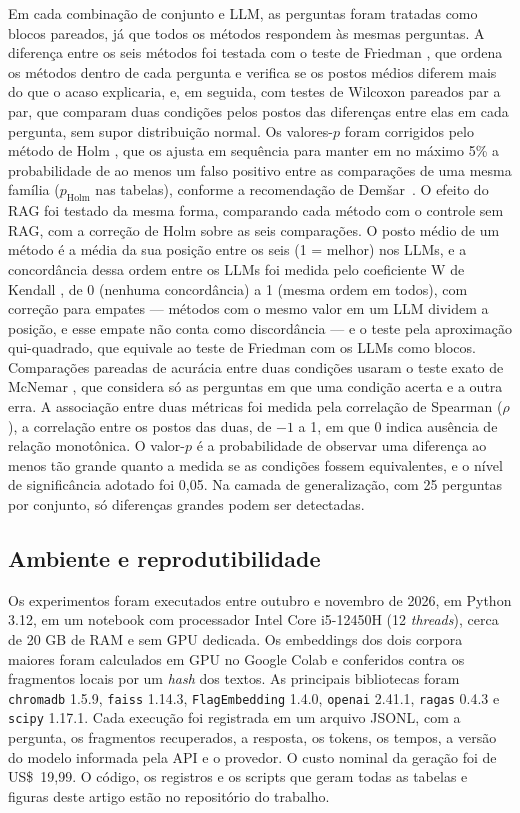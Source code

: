 Em cada combinação de conjunto e LLM, as perguntas foram tratadas como blocos pareados, já que todos os métodos respondem às mesmas perguntas. A diferença entre os seis métodos foi testada com o teste de Friedman \cite{friedman1937ranks}, que ordena os métodos dentro de cada pergunta e verifica se os postos médios diferem mais do que o acaso explicaria, e, em seguida, com testes de Wilcoxon pareados \cite{wilcoxon1945individual} par a par, que comparam duas condições pelos postos das diferenças entre elas em cada pergunta, sem supor distribuição normal. Os valores-$p$ foram corrigidos pelo método de Holm \cite{holm1979simple}, que os ajusta em sequência para manter em no máximo 5\% a probabilidade de ao menos um falso positivo entre as comparações de uma mesma família ($p_{\text{Holm}}$ nas tabelas), conforme a recomendação de Demšar~\cite{demsar2006statistical}. O efeito do RAG foi testado da mesma forma, comparando cada método com o controle sem RAG, com a correção de Holm sobre as seis comparações. O posto médio de um método é a média da sua posição entre os seis (1 = melhor) nos LLMs, e a concordância dessa ordem entre os LLMs foi medida pelo coeficiente W de Kendall \cite{kendall1939mrankings}, de 0 (nenhuma concordância) a 1 (mesma ordem em todos), com correção para empates --- métodos com o mesmo valor em um LLM dividem a posição, e esse empate não conta como discordância --- e o teste pela aproximação qui-quadrado, que equivale ao teste de Friedman com os LLMs como blocos. Comparações pareadas de acurácia entre duas condições usaram o teste exato de McNemar \cite{mcnemar1947note}, que considera só as perguntas em que uma condição acerta e a outra erra. A associação entre duas métricas foi medida pela correlação de Spearman \cite{spearman1904proof} ($\rho$), a correlação entre os postos das duas, de $-1$ a 1, em que 0 indica ausência de relação monotônica. O valor-$p$ é a probabilidade de observar uma diferença ao menos tão grande quanto a medida se as condições fossem equivalentes, e o nível de significância adotado foi 0,05. Na camada de generalização, com 25 perguntas por conjunto, só diferenças grandes podem ser detectadas.

\subsection{Ambiente e reprodutibilidade}

Os experimentos foram executados entre outubro e novembro de 2026, em Python 3.12, em um notebook com processador Intel Core i5-12450H (12 \emph{threads}), cerca de 20 GB de RAM e sem GPU dedicada. Os embeddings dos dois corpora maiores foram calculados em GPU no Google Colab e conferidos contra os fragmentos locais por um \emph{hash} dos textos. As principais bibliotecas foram \texttt{chromadb} 1.5.9, \texttt{faiss} 1.14.3, \texttt{FlagEmbedding} 1.4.0, \texttt{openai} 2.41.1, \texttt{ragas} 0.4.3 e \texttt{scipy} 1.17.1. Cada execução foi registrada em um arquivo JSONL, com a pergunta, os fragmentos recuperados, a resposta, os tokens, os tempos, a versão do modelo informada pela API e o provedor. O custo nominal da geração foi de US\$~19,99. O código, os registros e os scripts que geram todas as tabelas e figuras deste artigo estão no repositório do trabalho.
